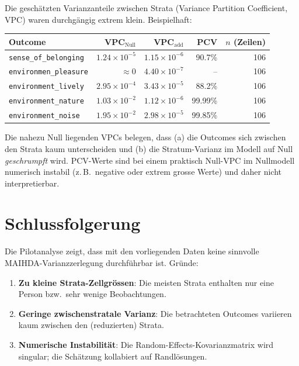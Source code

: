 Die geschätzten Varianzanteile zwischen Strata (Variance Partition Coefficient, VPC) waren durchgängig extrem klein. Beispielhaft:

\begin{center}
\begin{tabular}{lrrrr}
\toprule
Outcome & VPC$_{\text{Null}}$ & VPC$_{\text{add}}$ & PCV & $n$ (Zeilen) \\
\midrule
\texttt{sense\_of\_belonging}      & $1.24\times 10^{-5}$ & $1.15\times 10^{-6}$ & 90.7\% & 106 \\
\texttt{environmen\_pleasure}      & $\approx 0$          & $4.40\times 10^{-7}$ & --      & 106 \\
\texttt{environment\_lively}       & $2.95\times 10^{-4}$ & $3.43\times 10^{-5}$ & 88.2\%  & 106 \\
\texttt{environment\_nature}       & $1.03\times 10^{-2}$ & $1.12\times 10^{-6}$ & 99.99\% & 106 \\
\texttt{environment\_noise}        & $1.95\times 10^{-2}$ & $2.98\times 10^{-5}$ & 99.85\% & 106 \\
\bottomrule
\end{tabular}
\end{center}

Die nahezu Null liegenden VPCs belegen, dass (a) die Outcomes sich zwischen den Strata kaum unterscheiden und (b) die Stratum-Varianz im Modell auf Null \emph{geschrumpft} wird. PCV-Werte sind bei einem praktisch Null-VPC im Nullmodell numerisch instabil (z.\,B.\ negative oder extrem grosse Werte) und daher nicht interpretierbar.

\section{Schlussfolgerung}
Die Pilotanalyse zeigt, dass mit den vorliegenden Daten keine sinnvolle MAIHDA-Varianzzerlegung durchführbar ist. Gründe:
\begin{enumerate}
    \item \textbf{Zu kleine Strata-Zellgrössen}: Die meisten Strata enthalten nur eine Person bzw.\ sehr wenige Beobachtungen.
    \item \textbf{Geringe zwischenstratale Varianz}: Die betrachteten Outcomes variieren kaum zwischen den (reduzierten) Strata.
    \item \textbf{Numerische Instabilität}: Die Random-Effects-Kovarianzmatrix wird singular; die Schätzung kollabiert auf Randlösungen.
\end{enumerate}

